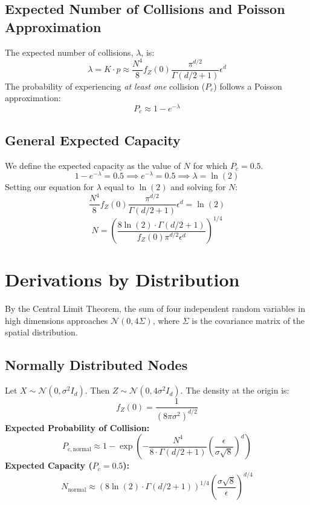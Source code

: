 \documentclass[12pt]{article}
\begin{document}
\subsection{Expected Number of Collisions and Poisson Approximation}
The expected number of collisions, $\lambda$, is:
\begin{equation}
    \lambda = K \cdot p \approx \frac{N^4}{8} f_Z(0) \frac{\pi^{d/2}}{\Gamma(d/2 + 1)} \epsilon^d
\end{equation}
The probability of experiencing \textit{at least one} collision ($P_c$) follows a Poisson approximation:
\begin{equation}
    P_c \approx 1 - e^{-\lambda}
\end{equation}

\subsection{General Expected Capacity}
We define the expected capacity as the value of $N$ for which $P_c = 0.5$.
\begin{equation}
    1 - e^{-\lambda} = 0.5 \implies e^{-\lambda} = 0.5 \implies \lambda = \ln(2)
\end{equation}
Setting our equation for $\lambda$ equal to $\ln(2)$ and solving for $N$:
\begin{equation}
    \frac{N^4}{8} f_Z(0) \frac{\pi^{d/2}}{\Gamma(d/2 + 1)} \epsilon^d = \ln(2)
\end{equation}
\begin{equation}
    N = \left( \frac{8 \ln(2) \cdot \Gamma(d/2 + 1)}{f_Z(0) \pi^{d/2} \epsilon^d} \right)^{1/4}
\end{equation}

\section{Derivations by Distribution}
By the Central Limit Theorem, the sum of four independent random variables in high dimensions approaches $\mathcal{N}(0, 4\Sigma)$, where $\Sigma$ is the covariance matrix of the spatial distribution.

\subsection{Normally Distributed Nodes}
Let $X \sim \mathcal{N}(0, \sigma^2 I_d)$. Then $Z \sim \mathcal{N}(0, 4\sigma^2 I_d)$.
The density at the origin is:
\begin{equation}
    f_Z(0) = \frac{1}{(8\pi\sigma^2)^{d/2}}
\end{equation}
\textbf{Expected Probability of Collision:}
\begin{equation}
    P_{c, \text{normal}} \approx 1 - \exp\left( - \frac{N^4}{8 \cdot \Gamma(d/2 + 1)} \left( \frac{\epsilon}{\sigma \sqrt{8}} \right)^d \right)
\end{equation}
\textbf{Expected Capacity ($P_c = 0.5$):}
\begin{equation}
    N_{\text{normal}} \approx \left( 8 \ln(2) \cdot \Gamma(d/2 + 1) \right)^{1/4} \left( \frac{\sigma \sqrt{8}}{\epsilon} \right)^{d/4}
\end{equation}
\end{document}
